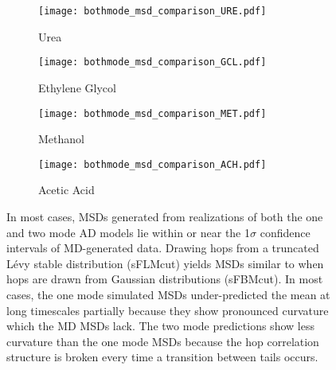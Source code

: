 \documentclass[journal=ancac3,manuscript=article,layout=twocolumn]{achemso}
\begin{document}
  \begin{figure*}
  \centering
  \begin{subfigure}{0.45\textwidth}
  \texttt{[image: bothmode\_msd\_comparison\_URE.pdf]}
  \caption{Urea}\label{fig:bothmode_msd_comparison_URE}
  \end{subfigure}
  \begin{subfigure}{0.45\textwidth}
  \texttt{[image: bothmode\_msd\_comparison\_GCL.pdf]}
  \caption{Ethylene Glycol}\label{fig:bothmode_msd_comparison_GCL}
  \end{subfigure}
  \begin{subfigure}{0.45\textwidth}
  \texttt{[image: bothmode\_msd\_comparison\_MET.pdf]}
  \caption{Methanol}\label{fig:bothmode_msd_comparison_MET}
  \end{subfigure}
  \begin{subfigure}{0.45\textwidth}
  \texttt{[image: bothmode\_msd\_comparison\_ACH.pdf]}
  \caption{Acetic Acid}\label{fig:bothmode_msd_comparison_ACH}
  \end{subfigure}
  \caption{In most cases, MSDs generated from realizations of both the one and
	  two mode AD models lie within or near the 1$\sigma$ confidence
	  intervals of MD-generated data. Drawing hops from a truncated L\'evy
	  stable distribution (sFLMcut) yields MSDs similar to when hops are
	  drawn from Gaussian distributions (sFBMcut). In most cases, the one
	  mode simulated MSDs under-predicted the mean at long timescales
	  partially because they show pronounced curvature which the MD MSDs
	  lack. The two mode predictions show less curvature than the one mode
	  MSDs because the hop correlation structure is broken every time a
	  transition between tails occurs.
  }\label{fig:anomalous_msds}
  \end{figure*}
  
\end{document}
